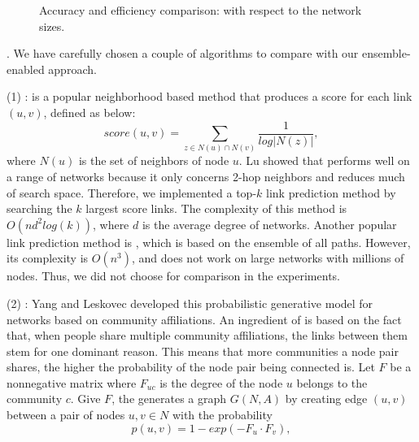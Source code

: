 \begin{figure}[tb!]
  \quad\quad
  \quad\quad
  \vspace{-2ex}
  \caption{Accuracy and efficiency comparison: with respect to the network sizes.}\label{exp-n}
  \vspace{-3ex}
\end{figure}


. We have carefully chosen a couple of algorithms
to compare with our ensemble-enabled approach.


  \noindent (1) \Adamic \cite{adamic}: \Aa is a popular neighborhood based method that
  produces a score for each link $(u, v)$, defined as below:
  \vspace{-2ex}
  \[ score(u, v) = \sum_{z \in N(u)\cap N(v)}\frac{1}{log|N(z)|}, \]
    \vspace{-.5ex}
  where $N(u)$ is the set of neighbors of node $u$. Lu \cite{linyuan-2011} showed that
  \Aa performs well on a range of networks because it only concerns 2-hop neighbors and
  reduces much of search space. Therefore, we implemented a top-$k$ link prediction
  method by searching the $k$ largest \Aa score links. The complexity of this method is
  $O(nd^2log(k))$, where $d$ is the average degree of networks. Another popular link
  prediction method is \Katz \cite{katz-1953}, which is based on the ensemble of all paths. However, its
  complexity is $O(n^3)$, and does not work on large networks with millions
  of nodes. Thus, we did not choose \Katz for comparison in the experiments.



  \noindent (2) \CAMBN \cite{yang-wsdm2013}:
  Yang and Leskovec developed this probabilistic generative model for networks
  based on community affiliations. An ingredient of \BIGCLAM is based on the fact that,
  when people share multiple community affiliations, the links between them stem for
  one dominant reason. This means that more communities a node pair shares,
  the higher the probability of the  node pair being connected is.
  Let $F$ be a nonnegative matrix where $F_{uc}$ is the degree of the node $u$ belongs to
  the community $c$. Give $F$, the \BIGCLAM generates a graph $G(N, A)$ by creating edge
  $(u, v)$ between a pair of nodes $u, v \in N$ with the probability
    \[ p(u, v) = 1 - exp(-F_u\cdot F_v), \]

